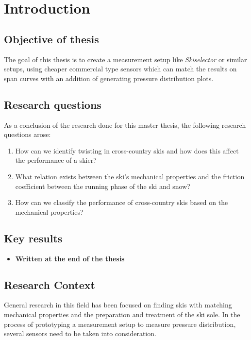 \chapter{Introduction}


\section{Objective of thesis}
The goal of this thesis is to create a measurement setup like \textit{Skiselector} or similar setups, using cheaper commercial type sensors which can match the results on span curves with an addition of generating pressure distribution plots.

\section{Research questions}
\label{sec:researchquestions}
As a conclusion of the research done for this master thesis, the following research questions arose:

\begin{enumerate}[label=\textbf{\Alph*}]
    \item How can we identify twisting in cross-country skis and how does this affect the performance of a skier?
    \item What relation exists between the ski's mechanical properties and the friction coefficient between the running phase of the ski and snow?
    \item How can we classify the performance of cross-country skis based on the mechanical properties?
\end{enumerate}

\section{Key results}
\begin{itemize}
    \item \textbf{Written at the end of the thesis}
\end{itemize}

\section{Research Context}
\label{sec:reasearchcontext}
General research in this field has been focused on finding skis with matching mechanical properties and the preparation and treatment of the ski sole.
In the process of prototyping a measurement setup to measure pressure distribution, several sensors need to be taken into consideration. 

